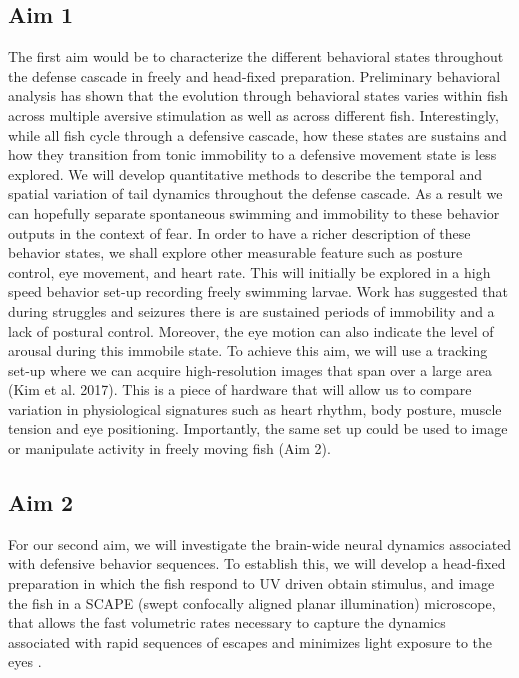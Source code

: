 \documentclass[]{article}
\begin{document}
\subsection{Aim 1}
The first aim would be to characterize the different behavioral states throughout the defense cascade in freely and head-fixed preparation. Preliminary behavioral analysis has shown that the evolution through behavioral states varies within fish across multiple aversive stimulation as well as across different fish. Interestingly, while all fish cycle through a defensive cascade, how these states are sustains and how they transition from tonic immobility to a defensive movement state is less explored. We will develop quantitative methods to describe the temporal and spatial variation of tail dynamics throughout the defense cascade. As a result we can hopefully separate spontaneous swimming and immobility to these behavior outputs in the context of fear. In order to have a richer description of these behavior states, we shall explore other measurable feature such as posture control, eye movement, and heart rate. This will initially be explored in a high speed behavior set-up recording freely swimming larvae. Work has suggested that during struggles and seizures there is are sustained periods of immobility and a lack of postural control. Moreover, the eye motion can also indicate the level of arousal during this immobile state.  To achieve this aim, we will use a tracking set-up where we can acquire high-resolution images that span over a large area (Kim et al. 2017). This is a piece of hardware that will allow us to compare variation in physiological signatures such as heart rhythm, body posture, muscle tension and eye positioning. Importantly, the same set up could be used to image or manipulate activity in freely moving fish (Aim 2).

\subsection{Aim 2}
For our second aim, we will investigate the brain-wide neural dynamics associated with defensive behavior sequences. To establish this, we will develop a head-fixed preparation in which the fish respond to UV driven obtain stimulus, and image the fish in a SCAPE (swept confocally aligned planar illumination) microscope, that allows the fast volumetric rates necessary to capture the dynamics associated with rapid sequences of escapes and minimizes light exposure to the eyes \cite{Bouchard_2015, Voleti_2019}. 
\end{document}
